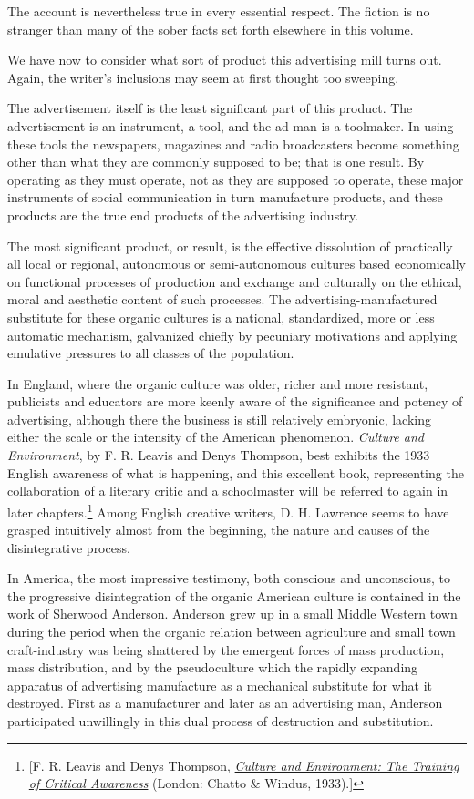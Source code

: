 \documentclass[twoside,nohyper,openany,nobib]{tufte-book}
\begin{document}
The account is nevertheless true in every essential respect. The fiction
is no stranger than many of the sober facts set forth elsewhere in this
volume.

We have now to consider what sort of product this advertising mill turns
out. Again, the writer's inclusions may seem at first thought too
sweeping.

The advertisement itself is the least significant part of this product.
The advertisement is an instrument, a tool, and the ad-man is a
toolmaker. In using these tools the newspapers, magazines and radio
broadcasters become something other than what they are commonly supposed
to be; that is one result. By operating as they must operate, not as
they are supposed to operate, these major instruments of social
communication in turn manufacture products, and these products are the
true end products of the advertising industry.

The most significant product, or result, is the effective dissolution of
practically all local or regional, autonomous or semi-autonomous
cultures based economically on functional processes of production and
exchange and culturally on the ethical, moral and aesthetic content of
such processes. The advertising-manufactured substitute for these
organic cultures is a national, standardized, more or less automatic
mechanism, galvanized chiefly by pecuniary motivations and applying
emulative pressures to all classes of the population.

In England, where the organic culture was older, richer and more
resistant, publicists and educators are more keenly aware of the
significance and potency of advertising, although there the business is
still relatively embryonic, lacking either the scale or the intensity of
the American phenomenon. \emph{Culture and Environment}, by F. R. Leavis
and Denys Thompson, best exhibits the 1933 English awareness of what is
happening, and this excellent book, representing the collaboration of a
literary critic and a schoolmaster will be referred to again in later
chapters.\footnote{{[}F. R. Leavis and Denys Thompson,
  \emph{\href{http://www.worldcat.org/oclc/188346}{Culture and
  Environment: The Training of Critical Awareness}} (London: Chatto \&
  Windus, 1933).{]}} Among English creative writers, D. H. Lawrence seems to
have grasped intuitively almost from the beginning, the nature and
causes of the disintegrative process.

In America, the most impressive testimony, both conscious and
unconscious, to the progressive disintegration of the organic American
culture is contained in the work of Sherwood Anderson. Anderson grew up
in a small Middle Western town during the period when the organic
relation between agriculture and small town craft-industry was being
shattered by the emergent forces of mass production, mass distribution,
and by the pseudoculture which the rapidly expanding apparatus of
advertising manufacture as a mechanical substitute for what it
destroyed. First as a manufacturer and later as an advertising man,
Anderson participated unwillingly in this dual process of destruction
and substitution.
\end{document}
